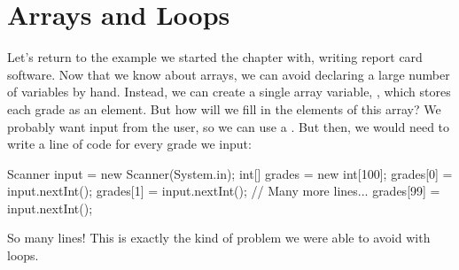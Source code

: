 






\section{Arrays and Loops}

Let's return to the example we started the chapter with, writing report card software. Now that we know about arrays, we can avoid declaring a large number of variables by hand. Instead, we can create a single array variable, , which stores each grade as an element. But how will we fill in the elements of this array? We probably want input from the user, so we can use a . But then, we would need to write a line of code for every grade we input:
\begin{code}
Scanner input = new Scanner(System.in);
int[] grades = new int[100];
grades[0] = input.nextInt();
grades[1] = input.nextInt();
// Many more lines...
grades[99] = input.nextInt();
\end{code}
So many lines! This is exactly the kind of problem we were able to avoid with loops.

